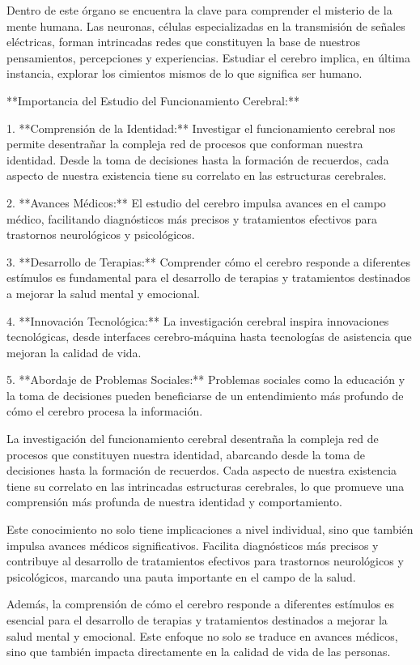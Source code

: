 \documentclass[12pt,oneside]{uhthesis}
\begin{document}
Dentro de este órgano se encuentra la clave para comprender el misterio de la mente humana. Las neuronas, células especializadas en la transmisión de señales eléctricas, forman intrincadas redes que constituyen la base de nuestros pensamientos, percepciones y experiencias. Estudiar el cerebro implica, en última instancia, explorar los cimientos mismos de lo que significa ser humano.

**Importancia del Estudio del Funcionamiento Cerebral:**

1. **Comprensión de la Identidad:** Investigar el funcionamiento cerebral nos permite desentrañar la compleja red de procesos que conforman nuestra identidad. Desde la toma de decisiones hasta la formación de recuerdos, cada aspecto de nuestra existencia tiene su correlato en las estructuras cerebrales.

2. **Avances Médicos:** El estudio del cerebro impulsa avances en el campo médico, facilitando diagnósticos más precisos y tratamientos efectivos para trastornos neurológicos y psicológicos.

3. **Desarrollo de Terapias:** Comprender cómo el cerebro responde a diferentes estímulos es fundamental para el desarrollo de terapias y tratamientos destinados a mejorar la salud mental y emocional.

4. **Innovación Tecnológica:** La investigación cerebral inspira innovaciones tecnológicas, desde interfaces cerebro-máquina hasta tecnologías de asistencia que mejoran la calidad de vida.

5. **Abordaje de Problemas Sociales:** Problemas sociales como la educación y la toma de decisiones pueden beneficiarse de un entendimiento más profundo de cómo el cerebro procesa la información.

La investigación del funcionamiento cerebral desentraña la compleja red de procesos que constituyen nuestra identidad, abarcando desde la toma de decisiones hasta la formación de recuerdos. Cada aspecto de nuestra existencia tiene su correlato en las intrincadas estructuras cerebrales, lo que promueve una comprensión más profunda de nuestra identidad y comportamiento.

Este conocimiento no solo tiene implicaciones a nivel individual, sino que también impulsa avances médicos significativos. Facilita diagnósticos más precisos y contribuye al desarrollo de tratamientos efectivos para trastornos neurológicos y psicológicos, marcando una pauta importante en el campo de la salud.

Además, la comprensión de cómo el cerebro responde a diferentes estímulos es esencial para el desarrollo de terapias y tratamientos destinados a mejorar la salud mental y emocional. Este enfoque no solo se traduce en avances médicos, sino que también impacta directamente en la calidad de vida de las personas.
\end{document}
